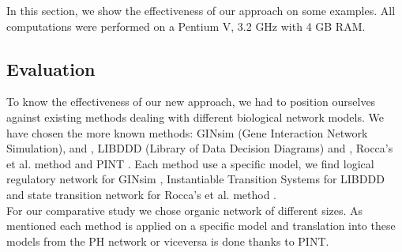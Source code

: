 In this section, we show the effectiveness of our approach on some examples. All
computations were performed on a Pentium V, 3.2 GHz with 4 GB RAM.

\subsection{Evaluation}
To know the effectiveness of our new approach, we had to position ourselves against existing methods dealing with different biological network models. We have chosen the more known methods: GINsim (Gene Interaction Network
Simulation)\cite{gonzalez2006ginsim}, \cite{naldi2009logical} and \cite{naldi2007decision}, LIBDDD (Library of Data Decision
Diagrams) \cite{thierry2009hierarchical} and \cite{colange2013towards}, Rocca's et al. method \cite{roccaasp} and PINT \cite{pauleve2011modelisation}.
Each method use a specific model, we find logical regulatory network for GINsim , Instantiable Transition Systems for LIBDDD  and state transition network for Rocca's et al. method \cite{roccaasp}.\\
For our comparative study we chose organic network of different sizes. As mentioned each method is applied on a specific model and translation into these models from the PH network or viceversa is done thanks to PINT.

